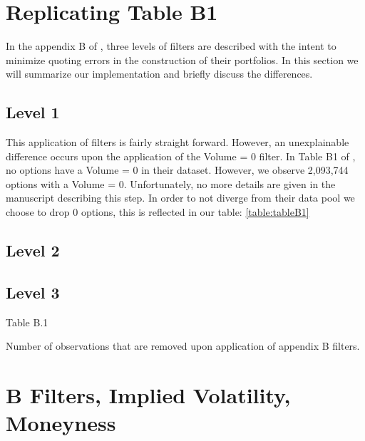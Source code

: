 \doublespacing



\section{Replicating Table B1}

In the appendix B of \citet{constantinides2013}, three levels of filters are described with the intent to minimize quoting errors in the construction of their portfolios. In this section we will summarize our implementation and briefly discuss the differences. 

\subsection{Level 1} 
This application of filters is fairly straight forward. However, an unexplainable difference occurs upon the application of the Volume = 0 filter. In Table B1 of \citet{constantinides2013}, no options have a Volume = 0 in their dataset. However, we observe 2,093,744 options with a Volume = 0. Unfortunately, no more details are given in the manuscript describing this step. In order to not diverge from their data pool we choose to drop 0 options, this is reflected in our table: \ref{table:tableB1}


\subsection {Level 2}

\subsection{Level 3} 

\newpage 

\thispagestyle{empty}
\begin{landscape}

\begin{table}

\centering
\caption{Table B.1}
\resizebox{1.4\textwidth}{!}{
\hspace*{-4cm}

}
\caption*{
  Number of observations that are removed upon application of appendix B filters. 
}
\label{table:tableB1}
\end{table}


\end{landscape}
\newpage

\section{B Filters, Implied Volatility, Moneyness} 



